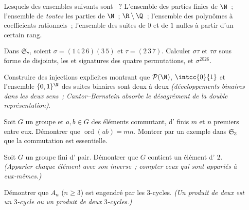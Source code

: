 \begin{exercise}[$\star$]\label{exo:b2:structures:1}
Lesquels des ensembles suivants sont ~? L'ensemble des
parties finies de $\N$~; l'ensemble de \emph{toutes} les parties de
$\N$~; $\R \setminus \Q$~; l'ensemble des polynômes à coefficients
rationnels~; l'ensemble des suites de $0$ et de $1$ nulles à partir
d'un certain rang.
\end{exercise}

\begin{exercise}[$\star$]\label{exo:b2:structures:2}
Dans $\mathfrak{S}_7$, soient $\sigma = (1\,4\,2\,6)(3\,5)$ et $\tau =
(2\,3\,7)$. Calculer $\sigma\tau$ et $\tau\sigma$ sous forme de 
disjoints, les  et signatures des quatre permutations, et
$\sigma^{2026}$.
\end{exercise}

\begin{exercise}[$\star$]\label{exo:b2:structures:3}
Construire des injections explicites montrant que $\mathcal{P}(\N)$,
$\intcc{0}{1}$ et l'ensemble $\{0,1\}^{\N}$ des suites binaires sont
deux à deux  \emph{(développements binaires dans les deux
sens~; Cantor--Bernstein absorbe le désagrément de la double
représentation)}.
\end{exercise}

\begin{exercise}[$\star$]\label{exo:b2:structures:4}
Soit $G$ un groupe et $a, b \in G$ des éléments commutant, d'
finis $m$ et $n$ premiers entre eux. Démontrer que
$\operatorname{ord}(ab) = mn$. Montrer par un exemple dans
$\mathfrak{S}_3$ que la commutation est essentielle.
\end{exercise}

\begin{exercise}[$\star\star$]\label{exo:b2:structures:5}
Soit $G$ un groupe fini d' pair. Démontrer que $G$ contient un
élément d' $2$. \emph{(Apparier chaque élément avec son inverse~;
compter ceux qui sont appariés à eux-mêmes.)}
\end{exercise}

\begin{exercise}[$\star\star$]\label{exo:b2:structures:6}
Démontrer que $A_n$ ($n \geq 3$) est engendré par les $3$-cycles.
\emph{(Un produit de deux  est un $3$-cycle ou un
produit de deux $3$-cycles.)}
\end{exercise}

